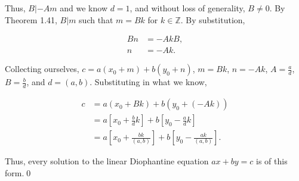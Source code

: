 \documentclass[12pt]{article}
\begin{document}
\noindent Thus, $B|-Am$ and we know $d=1$, and without loss of generality, $B\not= 0$. By Theorem 1.41, $B|m$ such that $m=Bk$ for $k\in\mathbb{Z}$. By substitution,

\begin{align*}
Bn &= -AkB,\\
n &= -Ak.
\end{align*}

\noindent Collecting ourselves, $c = a(x_{0}+m) + b(y_{0}+n)$, $m=Bk$, $n=-Ak$, $A=\frac{a}{d}$, $B=\frac{b}{d}$, and $d=(a,b)$. Substituting in what we know,

\begin{align*}
c &= a(x_{0}+Bk) + b(y_{0}+(-Ak)) \\
&= a\left[x_{0}+\frac{b}{d}k\right] + b\left[y_{0}-\frac{a}{d}k\right] \\
&= a\left[x_{0}+\frac{bk}{(a,b)}\right] + b\left[y_{0}-\frac{ak}{(a,b)}\right].
\end{align*}

\noindent Thus, every solution to the linear Diophantine equation $ax+by=c$ is of this form.\qed
\end{document}
